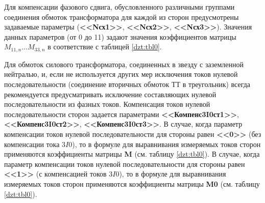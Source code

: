 Для компенсации фазового сдвига, обусловленного различными группами соединения обмоток трансформатора для каждой из сторон предусмотрены задаваемые параметры (\textbf{<<Nсх1>>}, \textbf{<<Nсх2>>}, \textbf{<<Nсх3>>}). Значения данных параметров (от 0 до 11) задают значения коэффициентов матрицы $M_{11,n}\dots M_{33,n}$ в соответствие с таблицей \ref{dzt:tbl0}.

\vspace{1mm}
\emph{}
\par
\vspace{1mm}

Для обмоток силового трансформатора, соединенных в звезду с заземленной нейтралью, и, если не используется других мер исключения токов нулевой последовательности (соединение вторичных обмоток ТТ в треугольник) всегда рекомендуется предусматривать исключение составляющих нулевой последовательности из фазных токов. Компенсация токов нулевой последовательности сторон задается параметрами \textbf{<<Компенс3I0ст1>>}, \textbf{<<Компенс3I0ст2>>}, \textbf{<<Компенс3I0ст3>>}. В случае, когда параметр компенсации токов нулевой последовательности для стороны равен \textbf{<<0>>} (без компенсации тока $3I0$), то в формуле для выравнивания измеряемых токов сторон применяются коэффициенты матрицы \textbf{M} (см. таблицу \ref{dzt:tbl0}). В случае, когда параметр компенсации токов нулевой последовательности для стороны равен \textbf{<<1>>} (с компенсацией токов $3I0$), то в формуле для выравнивания измеряемых токов сторон применяются коэффициенты матрицы \textbf{M0} (см. таблицу \ref{dzt:tbl0}).


